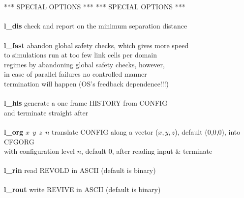 \begin{tabbing}
\>                                              \> \\
\>                                              \> \\
\> *** SPECIAL OPTIONS ***                      \> *** SPECIAL OPTIONS *** \\
\>                                              \> \\
\> {\bf l\_dis}                                 \> check and report on the minimum separation distance \\
\>                                              \> \\
\> {\bf l\_fast}                                \> abandon global safety checks, which gives more speed \\
\>                                              \> to simulations run at too few link cells per domain \\
\>                                              \> regimes by abandoning global safety checks, however, \\
\>                                              \> in case of parallel failures no controlled manner \\
\>                                              \> termination will happen (OS's feedback dependence!!!) \\
\>                                              \> \\
\> {\bf l\_his}                                 \> generate a one frame HISTORY from CONFIG \\
\>                                              \> and terminate straight after \\
\>                                              \> \\
\> {\bf l\_org} $x~~y~~z~~n$                    \> translate CONFIG along a vector ($x,y,z$), default (0,0,0), into CFGORG \\
\>                                              \> with configuration level $n$, default 0,  after reading input \& terminate \\
\>                                              \> \\
\> {\bf l\_rin}                                 \> read REVOLD in ASCII (default is binary) \\
\>                                              \> \\
\> {\bf l\_rout}                                \> write REVIVE in ASCII (default is binary) \\

\end{tabbing}
